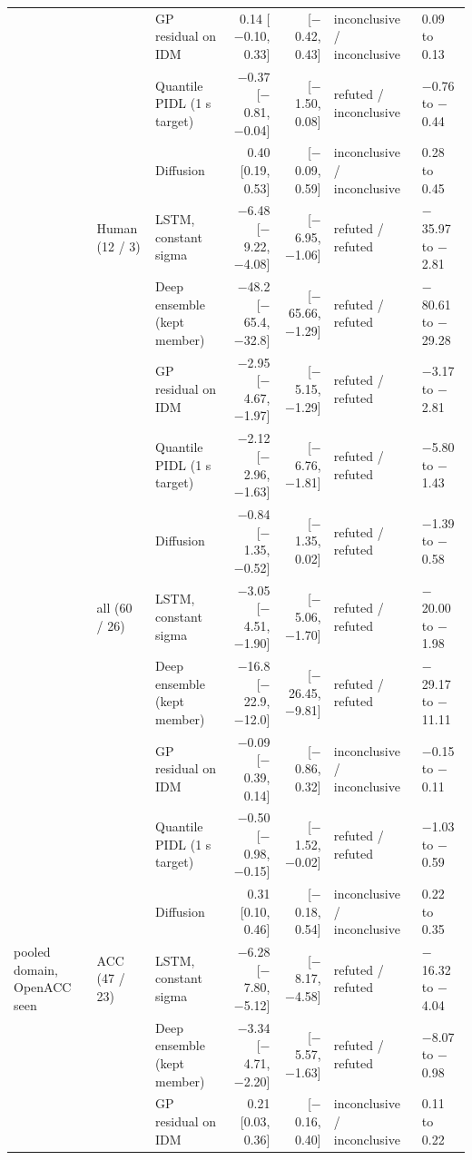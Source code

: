 \begin{longtable}{lllrrll}
 &  & GP residual on IDM & 0.14 [$-$0.10, 0.33] & [$-$0.42, 0.43] & inconclusive / inconclusive & 0.09 to 0.13 \\
 &  & Quantile PIDL (1 s target) & $-$0.37 [$-$0.81, $-$0.04] & [$-$1.50, 0.08] & refuted / inconclusive & $-$0.76 to $-$0.44 \\
 &  & Diffusion & 0.40 [0.19, 0.53] & [$-$0.09, 0.59] & inconclusive / inconclusive & 0.28 to 0.45 \\
\midrule
 & Human (12 / 3) & LSTM, constant sigma & $-$6.48 [$-$9.22, $-$4.08] & [$-$6.95, $-$1.06] & refuted / refuted & $-$35.97 to $-$2.81 \\
 &  & Deep ensemble (kept member) & $-$48.2 [$-$65.4, $-$32.8] & [$-$65.66, $-$1.29] & refuted / refuted & $-$80.61 to $-$29.28 \\
 &  & GP residual on IDM & $-$2.95 [$-$4.67, $-$1.97] & [$-$5.15, $-$1.29] & refuted / refuted & $-$3.17 to $-$2.81 \\
 &  & Quantile PIDL (1 s target) & $-$2.12 [$-$2.96, $-$1.63] & [$-$6.76, $-$1.81] & refuted / refuted & $-$5.80 to $-$1.43 \\
 &  & Diffusion & $-$0.84 [$-$1.35, $-$0.52] & [$-$1.35, 0.02] & refuted / refuted & $-$1.39 to $-$0.58 \\
\midrule
 & all (60 / 26) & LSTM, constant sigma & $-$3.05 [$-$4.51, $-$1.90] & [$-$5.06, $-$1.70] & refuted / refuted & $-$20.00 to $-$1.98 \\
 &  & Deep ensemble (kept member) & $-$16.8 [$-$22.9, $-$12.0] & [$-$26.45, $-$9.81] & refuted / refuted & $-$29.17 to $-$11.11 \\
 &  & GP residual on IDM & $-$0.09 [$-$0.39, 0.14] & [$-$0.86, 0.32] & inconclusive / inconclusive & $-$0.15 to $-$0.11 \\
 &  & Quantile PIDL (1 s target) & $-$0.50 [$-$0.98, $-$0.15] & [$-$1.52, $-$0.02] & refuted / refuted & $-$1.03 to $-$0.59 \\
 &  & Diffusion & 0.31 [0.10, 0.46] & [$-$0.18, 0.54] & inconclusive / inconclusive & 0.22 to 0.35 \\
\midrule
pooled domain, OpenACC seen & ACC (47 / 23) & LSTM, constant sigma & $-$6.28 [$-$7.80, $-$5.12] & [$-$8.17, $-$4.58] & refuted / refuted & $-$16.32 to $-$4.04 \\
 &  & Deep ensemble (kept member) & $-$3.34 [$-$4.71, $-$2.20] & [$-$5.57, $-$1.63] & refuted / refuted & $-$8.07 to $-$0.98 \\
 &  & GP residual on IDM & 0.21 [0.03, 0.36] & [$-$0.16, 0.40] & inconclusive / inconclusive & 0.11 to 0.22 \\

\end{longtable}
